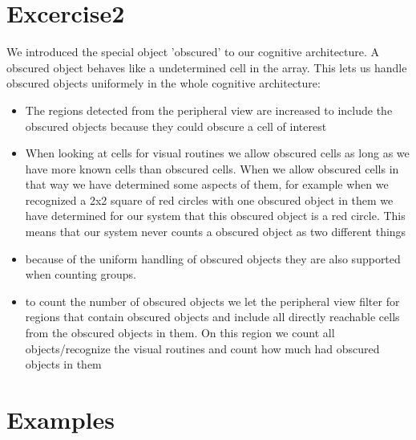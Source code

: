 \documentclass[11pt,a4paper,oneside]{scrartcl}
\begin{document}
\section{Excercise2}
\label{sec-2}
We introduced the special object 'obscured' to our cognitive
architecture. A obscured object behaves like a undetermined 
cell in the array. This lets us handle obscured objects uniformely
in the whole cognitive architecture:
\begin{itemize}
\item The regions detected from the peripheral view are increased to 
include the obscured objects because they could obscure a cell
of interest
\item When looking at cells for visual routines we allow obscured cells
as long as we have more known cells than obscured cells.
When we allow obscured cells in that way we have determined some
aspects of them, for example when we recognized a 2x2 square of 
red circles with one obscured object in them we have determined 
for our system that this obscured object is a red circle. This 
means that our system never counts a obscured object as two 
different things
\item because of the uniform handling of obscured objects they are also
supported when counting groups.
\item to count the number of obscured objects we let the peripheral view
filter for regions that contain obscured objects and include all 
directly reachable cells from the obscured objects in them. 
On this region we count all objects/recognize the visual routines
and count how much had obscured objects in them
\end{itemize}


\section{Examples}
\label{sec-3}
\end{document}
